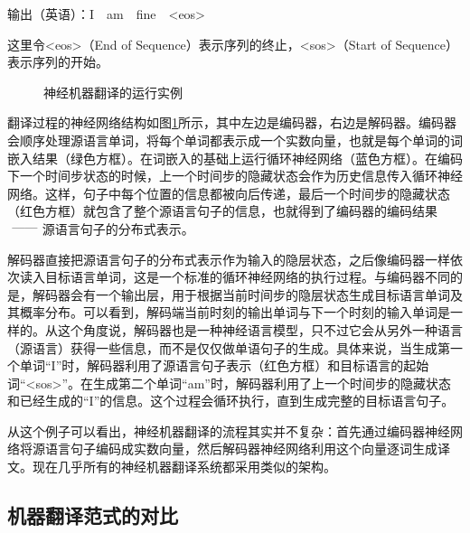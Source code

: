 \vspace{0.3em}
\parinterval  \hspace{5em} 输出（英语）：I\ \ am\ \ fine\ \ <eos>
\vspace{0.5em}

\noindent 这里令<eos>（End of Sequence）表示序列的终止，<sos>（Start of Sequence）表示序列的开始。

\begin{figure}[htp]
\centering

\caption{神经机器翻译的运行实例}
\label{fig:10-7}
\end{figure}

\parinterval 翻译过程的神经网络结构如图\ref{fig:10-7}所示，其中左边是编码器，右边是解码器。编码器会顺序处理源语言单词，将每个单词都表示成一个实数向量，也就是每个单词的词嵌入结果（绿色方框）。在词嵌入的基础上运行循环神经网络（蓝色方框）。在编码下一个时间步状态的时候，上一个时间步的隐藏状态会作为历史信息传入循环神经网络。这样，句子中每个位置的信息都被向后传递，最后一个时间步的隐藏状态（红色方框）就包含了整个源语言句子的信息，也就得到了编码器的编码结果$\ \dash\ $源语言句子的分布式表示。

\parinterval 解码器直接把源语言句子的分布式表示作为输入的隐层状态，之后像编码器一样依次读入目标语言单词，这是一个标准的循环神经网络的执行过程。与编码器不同的是，解码器会有一个输出层，用于根据当前时间步的隐层状态生成目标语言单词及其概率分布。可以看到，解码端当前时刻的输出单词与下一个时刻的输入单词是一样的。从这个角度说，解码器也是一种神经语言模型，只不过它会从另外一种语言（源语言）获得一些信息，而不是仅仅做单语句子的生成。具体来说，当生成第一个单词“I”时，解码器利用了源语言句子表示（红色方框）和目标语言的起始词“<sos>”。在生成第二个单词“am”时，解码器利用了上一个时间步的隐藏状态和已经生成的“I”的信息。这个过程会循环执行，直到生成完整的目标语言句子。

\parinterval 从这个例子可以看出，神经机器翻译的流程其实并不复杂：首先通过编码器神经网络将源语言句子编码成实数向量，然后解码器神经网络利用这个向量逐词生成译文。现在几乎所有的神经机器翻译系统都采用类似的架构。

\subsection{机器翻译范式的对比}

